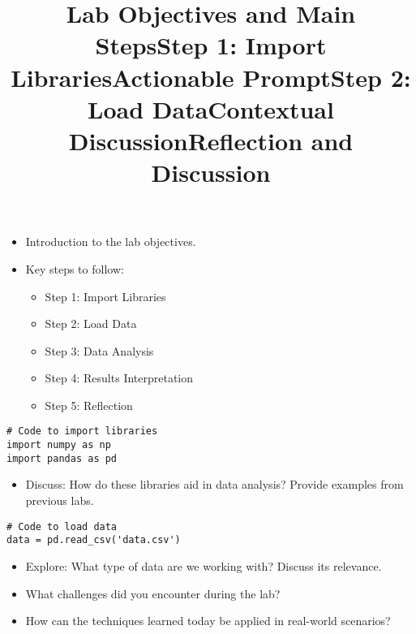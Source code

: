\documentclass{beamer}
\begin{document}
\begin{frame}
\title{Lab Objectives and Main Steps}
\begin{itemize}
  \item Introduction to the lab objectives.
  \item Key steps to follow:
    \begin{itemize}
      \item Step 1: Import Libraries
      \item Step 2: Load Data
      \item Step 3: Data Analysis
      \item Step 4: Results Interpretation
      \item Step 5: Reflection
    \end{itemize}
\end{itemize}
\end{frame}

\begin{frame}
\title{Step 1: Import Libraries}
\begin{verbatim}
# Code to import libraries
import numpy as np
import pandas as pd
\end{verbatim}
\title{Actionable Prompt}
\begin{itemize}
  \item Discuss: How do these libraries aid in data analysis? Provide examples from previous labs.
\end{itemize}
\end{frame}

\begin{frame}
\title{Step 2: Load Data}
\begin{verbatim}
# Code to load data
data = pd.read_csv('data.csv')
\end{verbatim}
\title{Contextual Discussion}
\begin{itemize}
  \item Explore: What type of data are we working with? Discuss its relevance.
\end{itemize}
\end{frame}

\begin{frame}
\title{Reflection and Discussion}
\begin{itemize}
  \item What challenges did you encounter during the lab?
  \item How can the techniques learned today be applied in real-world scenarios?
\end{itemize}
\end{frame}
\end{document}
